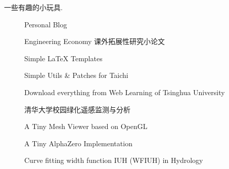 

一些有趣的小玩具.

\begin{description}
  \item[] Personal Blog
  \item[] Engineering Economy 课外拓展性研究小论文
  \item[] Simple \LaTeX{} Templates
  \item[] Simple Utils \& Patches for Taichi
  \item[] Download everything from Web Learning of Tsinghua University
  \item[] 清华大学校园绿化遥感监测与分析
  \item[] A Tiny Mesh Viewer based on OpenGL
  \item[] A Tiny AlphaZero Implementation
  \item[] Curve fitting width function IUH (WFIUH) in Hydrology
\end{description}
